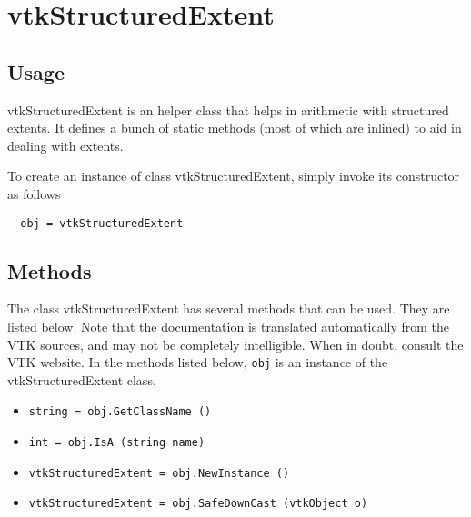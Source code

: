 \section{vtkStructuredExtent}

\subsection{Usage}

  vtkStructuredExtent is an helper class that helps in arithmetic with
  structured extents. It defines a bunch of static methods (most of which are
  inlined) to aid in dealing with extents.

To create an instance of class vtkStructuredExtent, simply
invoke its constructor as follows
\begin{verbatim}
  obj = vtkStructuredExtent
\end{verbatim}
\subsection{Methods}

The class vtkStructuredExtent has several methods that can be used.
  They are listed below.
Note that the documentation is translated automatically from the VTK sources,
and may not be completely intelligible.  When in doubt, consult the VTK website.
In the methods listed below, \verb|obj| is an instance of the vtkStructuredExtent class.
\begin{itemize}
\item  \verb|string = obj.GetClassName ()|

\item  \verb|int = obj.IsA (string name)|

\item  \verb|vtkStructuredExtent = obj.NewInstance ()|

\item  \verb|vtkStructuredExtent = obj.SafeDownCast (vtkObject o)|

\end{itemize}
